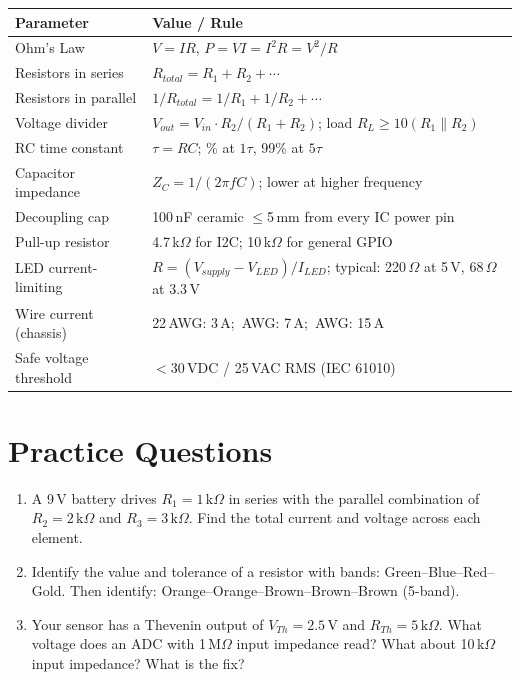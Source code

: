 \begin{quickrefbox}
\begin{table}[H]\centering\small
\begin{tabularx}{\textwidth}{l X}
\toprule
\textbf{Parameter} & \textbf{Value / Rule} \\
\midrule
Ohm's Law & $V = IR$, \; $P = VI = I^2R = V^2/R$ \\
Resistors in series & $R_{total} = R_1 + R_2 + \cdots$ \\
Resistors in parallel & $1/R_{total} = 1/R_1 + 1/R_2 + \cdots$ \\
Voltage divider & $V_{out} = V_{in} \cdot R_2/(R_1 + R_2)$; \; load $R_L \geq 10(R_1 \| R_2)$ \\
RC time constant & $\tau = RC$; \; 63\% at $1\tau$, 99\% at $5\tau$ \\
Capacitor impedance & $Z_C = 1/(2\pi f C)$; \; lower at higher frequency \\
Decoupling cap & 100\,nF ceramic $\leq$5\,mm from every IC power pin \\
Pull-up resistor & 4.7\,k$\Omega$ for I2C; 10\,k$\Omega$ for general GPIO \\
LED current-limiting & $R = (V_{supply} - V_{LED})/I_{LED}$; \; typical: 220\,$\Omega$ at 5\,V, 68\,$\Omega$ at 3.3\,V \\
Wire current (chassis) & 22\,AWG: 3\,A; \; 18\,AWG: 7\,A; \; 14\,AWG: 15\,A \\
Safe voltage threshold & $<$30\,VDC / 25\,VAC RMS (IEC 61010) \\
\bottomrule
\end{tabularx}
\end{table}
\end{quickrefbox}

\section{Practice Questions}
\begin{enumerate}[leftmargin=1.5em]
\item A 9\,V battery drives $R_1 = 1\,\text{k}\Omega$ in series with the parallel combination of $R_2 = 2\,\text{k}\Omega$ and $R_3 = 3\,\text{k}\Omega$. Find the total current and voltage across each element.
\item Identify the value and tolerance of a resistor with bands: Green--Blue--Red--Gold. Then identify: Orange--Orange--Brown--Brown--Brown (5-band).
\item Your sensor has a Thevenin output of $V_{Th} = 2.5$\,V and $R_{Th} = 5\,\text{k}\Omega$. What voltage does an ADC with 1\,M$\Omega$ input impedance read? What about 10\,k$\Omega$ input impedance? What is the fix?
\end{enumerate}

